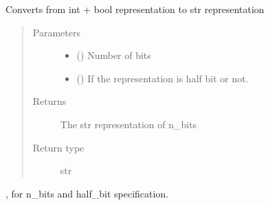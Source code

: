 \documentclass[letterpaper,10pt,english]{sphinxmanual}
\begin{document}
\begin{fulllineitems}
\label{\detokenize{gen:calib.gen.format_bits}}
Converts from int + bool representation to str representation
\begin{quote}\begin{description}
\item[{Parameters}] \leavevmode\begin{itemize}
\item {} 
 (\sphinxstyleliteralemphasis{\sphinxupquote{, }}\sphinxstyleliteralemphasis{\sphinxupquote{, }}) \textendash{} Number of bits

\item {} 
 () \textendash{} If the representation is half bit or not.

\end{itemize}

\item[{Returns}] \leavevmode
The str representation of n\_bits

\item[{Return type}] \leavevmode
str

\end{description}\end{quote}




{\hyperref[\detokenize{gen:calib.gen.parse_bits}]{}}, for n\_bits and half\_bit specification.



\end{fulllineitems}

\end{document}

